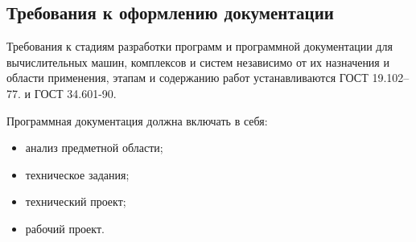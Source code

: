 \subsection{Требования к оформлению документации}

Требования к стадиям разработки программ и программной документации для вычислительных машин, комплексов и систем независимо от их назначения и области применения, этапам и содержанию работ устанавливаются ГОСТ 19.102–77. и ГОСТ 34.601-90. 

Программная документация должна включать в себя:

\begin{itemize}
	\item анализ предметной области;
	\item техническое задания;
	\item технический проект;
	\item рабочий проект.
\end{itemize}
